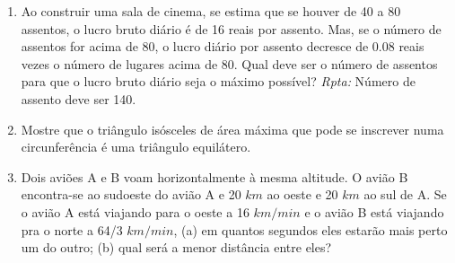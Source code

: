 \documentclass[latin,20pt]{article}
\begin{document}
\begin{enumerate}
        \item Ao construir uma sala de cinema, se estima que se houver de 40 a 80 assentos, o lucro bruto diário é de 16 reais por assento. Mas, se o número de assentos for acima de 80, 
        o lucro diário por assento decresce de 0.08 reais vezes o número de lugares acima de 80. 
        Qual deve ser o número de assentos para que o lucro bruto diário seja o máximo possível? {\it Rpta: } Número de assento deve ser 140.      
        \item Mostre que o triângulo isósceles de área máxima que pode se inscrever numa circunferência é uma triângulo equilátero.      
        \item Dois aviões A e B voam horizontalmente à mesma altitude. 
        O avião B encontra-se ao sudoeste do avião A e 20 $km$ ao oeste e 20 $km$ ao sul de A. Se o avião A está viajando para o oeste a 16 $km/min$ e o avião B está viajando pra o norte a 64/3 $km/min$, 
        (a) em quantos segundos eles estarão mais perto um do outro; 
        (b) qual será a menor distância entre eles?   
      \end{enumerate}      
\end{document}
